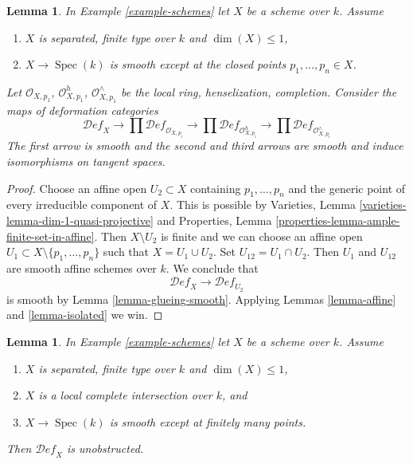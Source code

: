 \documentclass{stacks-project}
\theoremstyle{plain}
\newtheorem{lemma}[subsection]{Lemma}
\theoremstyle{definition}
\theoremstyle{remark}
\numberwithin{equation}{subsection}
\def\Spec{\mathop{\mathrm{Spec}}}
\def\Deformationcategory{\mathcal{D}\!\mathit{ef}}
\begin{document}
\begin{lemma}
\label{lemma-curve-isolated}
In Example \ref{example-schemes} let $X$ be a scheme over $k$. Assume
\begin{enumerate}
\item $X$ is separated, finite type over $k$ and $\dim(X) \leq 1$,
\item $X \to \Spec(k)$ is smooth except at the closed
points $p_1, \ldots, p_n \in X$.
\end{enumerate}
Let $\mathcal{O}_{X, p_1}$, $\mathcal{O}_{X, p_1}^h$,
$\mathcal{O}_{X, p_1}^\wedge$ be the local ring, henselization, completion.
Consider the maps of deformation categories
$$
\Deformationcategory_X
\longrightarrow
\prod \Deformationcategory_{\mathcal{O}_{X, p_i}}
\longrightarrow
\prod \Deformationcategory_{\mathcal{O}_{X, p_i}^h}
\longrightarrow
\prod \Deformationcategory_{\mathcal{O}_{X, p_i}^\wedge}
$$
The first arrow is smooth and the second and third arrows
are smooth and induce isomorphisms on tangent spaces.
\end{lemma}

\begin{proof}
Choose an affine open $U_2 \subset X$ containing
$p_1, \ldots, p_n$ and the generic point of every irreducible
component of $X$. This is possible by
Varieties, Lemma \ref{varieties-lemma-dim-1-quasi-projective}
and Properties, Lemma \ref{properties-lemma-ample-finite-set-in-affine}.
Then $X \setminus U_2$ is finite and we can choose an affine open
$U_1 \subset X \setminus \{p_1, \ldots, p_n\}$ such that
$X = U_1 \cup U_2$. Set $U_{12} = U_1 \cap U_2$.
Then $U_1$ and $U_{12}$ are smooth affine schemes over $k$.
We conclude that
$$
\Deformationcategory_X \longrightarrow \Deformationcategory_{U_2}
$$
is smooth by Lemma \ref{lemma-glueing-smooth}.
Applying Lemmas \ref{lemma-affine} and \ref{lemma-isolated} we win.
\end{proof}

\begin{lemma}
\label{lemma-curve-isolated-lci}
In Example \ref{example-schemes} let $X$ be a scheme over $k$. Assume
\begin{enumerate}
\item $X$ is separated, finite type over $k$ and $\dim(X) \leq 1$,
\item $X$ is a local complete intersection over $k$, and
\item $X \to \Spec(k)$ is smooth except at finitely many points.
\end{enumerate}
Then $\Deformationcategory_X$ is unobstructed.
\end{lemma}
\end{document}
